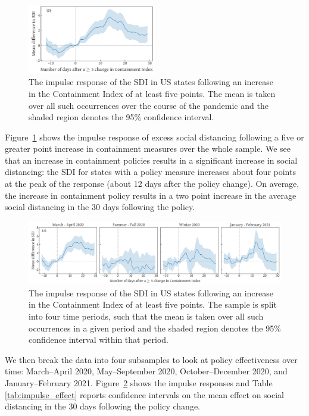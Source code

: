 \documentclass[dvipsnames]{article}
\begin{document}
\begin{figure}[h!]
    \centering
    \includegraphics[width=0.5\textwidth]{impulse_response_all.pdf}
    \caption{The impulse response of the SDI in US states following an increase in the Containment Index of at least five points. The mean is taken over all such occurrences over the course of the pandemic and the shaded region denotes the 95\% confidence interval.}
    \label{fig:impulse_response_all}
\end{figure}

Figure~\ref{fig:impulse_response_all} shows the impulse response of excess social distancing following a five or greater point increase in containment measures over the whole sample. We see that an increase in containment policies results in a significant increase in social distancing: the SDI for states with a policy measure increases about four points at the peak of the response (about 12 days after the policy change). On average, the increase in containment policy results in a two point increase in the average social distancing in the 30 days following the policy.

\begin{figure}[h!]
    \centering
    \includegraphics[width=\textwidth]{impulse_response_date.pdf}
    \caption{The impulse response of the SDI in US states following an increase in the Containment Index of at least five points. The sample is split into four time periods, such that the mean is taken over all such occurrences in a given period and the shaded region denotes the 95\% confidence interval within that period.}
    \label{fig:impulse_response_date}
\end{figure}

We then break the data into four subsamples to look at policy effectiveness over time: March--April 2020, May--September 2020, October--December 2020, and January--February 2021. Figure~\ref{fig:impulse_response_date} shows the impulse responses and Table \ref{tab:impulse_effect} reports confidence intervals on the mean effect on social distancing in the 30 days following the policy change.
\end{document}
